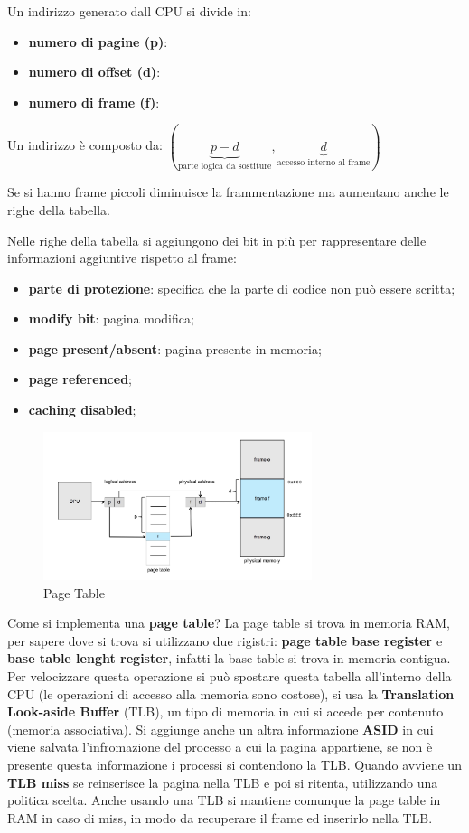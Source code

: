 \documentclass[12pt]{article}
\begin{document}
Un indirizzo generato dall CPU si divide in:
\begin{itemize}
  \item \textbf{numero di pagine (p)}: 
  \item \textbf{numero di offset (d)}:
  \item \textbf{numero di frame (f)}:
\end{itemize}
Un indirizzo \`e composto da: $(\underbrace{p-d}_\text{parte logica da sostiture}, \underbrace{d}_\text{accesso interno al frame})$
\begin{example}{}{}
  Se si hanno frame piccoli diminuisce la frammentazione ma aumentano anche le righe della tabella.
\end{example}
Nelle righe della tabella si aggiungono dei bit in pi\`u per rappresentare delle informazioni aggiuntive rispetto al frame:
\begin{itemize}
  \item \textbf{parte di protezione}: specifica che la parte di codice non pu\`o essere scritta;
  \item \textbf{modify bit}: pagina modifica;
  \item \textbf{page present/absent}:  pagina presente in memoria;
  \item \textbf{page referenced};
  \item \textbf{caching disabled};
\end{itemize}
\begin{figure}[H]
  \centering
  \includegraphics[width=0.7\textwidth]{page-table.png}
  \caption{Page Table}
  \label{fig:page-table}
\end{figure}
Come si implementa una \textbf{page table}? La page table si trova in memoria RAM, per sapere dove si trova si utilizzano due rigistri: \textbf{page table base register} e \textbf{base table lenght register}, infatti la base table si trova in memoria contigua. Per velocizzare questa operazione si pu\`o spostare questa tabella all'interno della CPU (le operazioni di accesso alla memoria sono costose), si usa la \textbf{Translation Look-aside Buffer} (TLB), un tipo di memoria in cui si accede per contenuto (memoria associativa). Si aggiunge anche un altra informazione \textbf{ASID} in cui viene salvata l'infromazione del processo a cui la pagina appartiene, se non \`e presente questa informazione i processi si contendono la TLB. Quando avviene un \textbf{TLB miss} se reinserisce la pagina nella TLB e poi si ritenta, utilizzando una politica scelta. Anche usando una TLB si mantiene comunque la page table in RAM in caso di miss, in modo da recuperare il frame ed inserirlo nella TLB.
\end{document}
